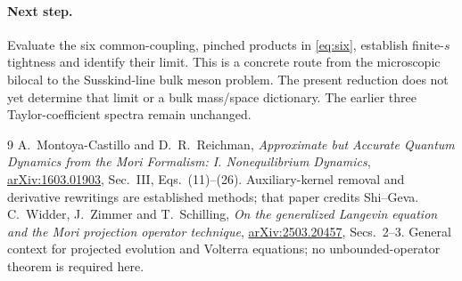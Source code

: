 \documentclass[11pt,a4paper]{article}
\begin{document}
\paragraph{Next step.}
Evaluate the six common-coupling, pinched products in
\eqref{eq:six}, establish finite-$s$ tightness and identify their
limit. This is a concrete route from the microscopic bilocal to
the Susskind-line bulk meson problem. The present reduction does
not yet determine that limit or a bulk mass/space dictionary.
The earlier three Taylor-coefficient spectra remain unchanged.

\begin{thebibliography}{9}
 A.~Montoya-Castillo and D.~R.~Reichman,
\emph{Approximate but Accurate Quantum Dynamics from the Mori
Formalism: I. Nonequilibrium Dynamics},
\href{https://arxiv.org/abs/1603.01903}{arXiv:1603.01903},
Sec.~III, Eqs.~(11)--(26). Auxiliary-kernel removal and derivative
rewritings are established methods; that paper credits Shi--Geva.
 C.~Widder, J.~Zimmer and T.~Schilling,
\emph{On the generalized Langevin equation and the Mori projection
operator technique}, \href{https://arxiv.org/abs/2503.20457}{arXiv:2503.20457},
Secs.~2--3. General context for projected evolution and Volterra
equations; no unbounded-operator theorem is required here.
\end{thebibliography}
\end{document}
